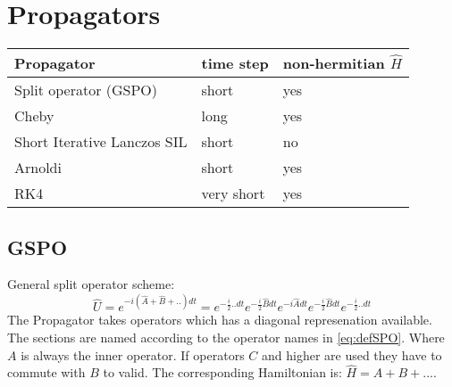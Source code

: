 \documentclass[a4paper,12pt]{scrbook}
\begin{document}
\section{Propagators}

\begin{center}
 \begin{tabular}{lll}
 \hline\hline
  Propagator & time step & non-hermitian $\hat H$ \\\hline
  Split operator (GSPO) & short & yes \\
  Cheby & long &  yes \\
  Short Iterative Lanczos SIL & short & no \\
  Arnoldi & short & yes \\
  RK4 & very short & yes \\\hline\hline
 \end{tabular}
\end{center}

\subsection{GSPO}
General split operator scheme:
\begin{equation}
\label{eq:defSPO}
\hat U = e^{-i(\hat A+ \hat B+..)dt} = e^{-\frac{i}{2} .. dt} e^{-\frac{i}{2} \hat B dt} e^{-i \hat A dt} e^{-\frac{i}{2} \hat B dt} e^{-\frac{i}{2} .. dt}
\end{equation}
The Propagator takes operators which has a diagonal represenation available.
The sections are named according to the operator names in \ref{eq:defSPO}. Where $A$ is always the inner operator.
If operators $C$ and higher are used they have to commute with $B$ to valid.
The corresponding Hamiltonian is: $\hat H = A + B + ...$.
\end{document}

